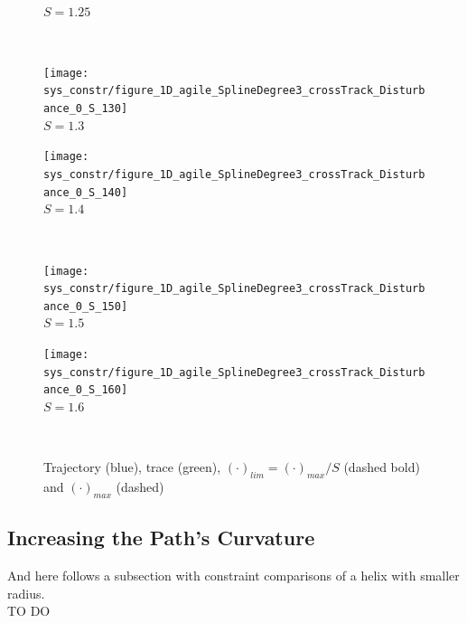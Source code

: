 \begin{figure}[h]
\begin{minipage}[t]{0.48\textwidth}
  \\ $S=1.25$
  \end{minipage}\\ \hspace{5pt}
  \begin{minipage}[t]{0.48\textwidth}
    \centering
    \texttt{[image: sys\_constr/figure\_1D\_agile\_SplineDegree3\_crossTrack\_Disturbance\_0\_S\_130]}
  \\ $S=1.3$
  \end{minipage}
  \begin{minipage}[t]{0.48\textwidth}
    \centering
    \texttt{[image: sys\_constr/figure\_1D\_agile\_SplineDegree3\_crossTrack\_Disturbance\_0\_S\_140]}
  \\ $S=1.4$
  \end{minipage}\\ \hspace{5pt}
  \begin{minipage}[t]{0.48\textwidth}
    \centering
    \texttt{[image: sys\_constr/figure\_1D\_agile\_SplineDegree3\_crossTrack\_Disturbance\_0\_S\_150]}
  \\ $S=1.5$
  \end{minipage}
  \begin{minipage}[t]{0.48\textwidth}
    \centering
    \texttt{[image: sys\_constr/figure\_1D\_agile\_SplineDegree3\_crossTrack\_Disturbance\_0\_S\_160]}
  \\ $S=1.6$
  \end{minipage} \\
  \label{fig:app_sys_constr}
  \caption{Trajectory (blue), trace (green), $(\cdot)_{lim}=(\cdot)_{max}/S$ (dashed bold) and $(\cdot)_{max}$ (dashed)}
\end{figure}



\subsection{Increasing the Path's Curvature}
\label{sub:app_increasing_curvature}
And here follows a subsection with constraint comparisons of a helix with smaller radius.
\\
TO DO
\\





